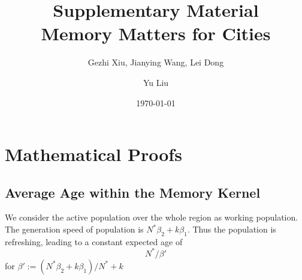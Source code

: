 \documentclass[aps,prl]{revtex4-2}
\begin{document}
\title{Supplementary Material\\Memory Matters for Cities}
\date{\today}
\author{Gezhi Xiu, Jianying Wang, Lei Dong}

\author{Yu Liu}

\pacs{} 



\maketitle
\tableofcontents
\vspace{1cm}

\section{Mathematical Proofs}

\subsection{Average Age within the Memory Kernel}

We consider the active population over the whole region as working population. The generation speed of population is $N^*\beta_2 + k\beta_1$. Thus the population is refreshing, leading to a constant expected age of \[N^*/\beta'\] for $\beta' := (N^*\beta_2 + k\beta_1)/N^*+k$




% 

    
\end{document}
